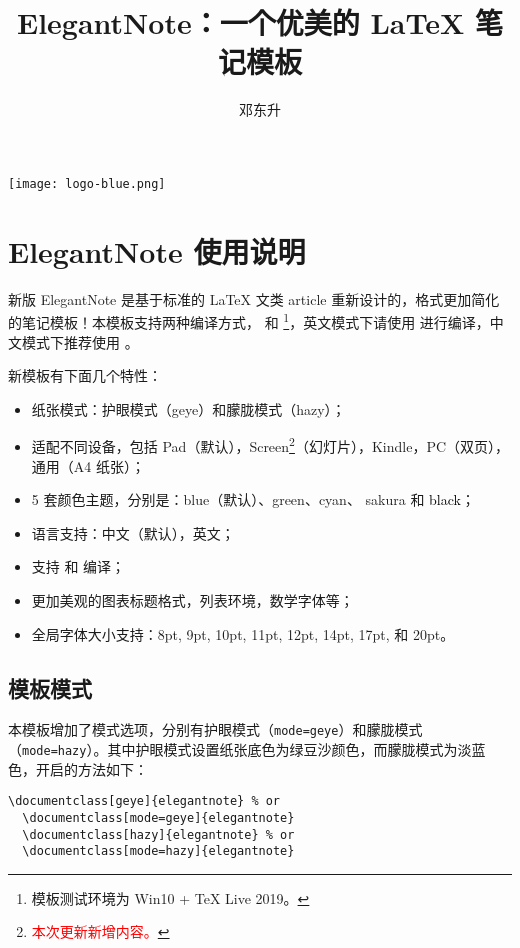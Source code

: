 \documentclass[cn,hazy,blue,screen,14pt]{elegantnote}
\title{ElegantNote：一个优美的 \LaTeX{} 笔记模板}
\author{邓东升}
\institute{Elegant\LaTeX{} Program}
\date{\zhtoday}
\begin{document}
\maketitle

\centerline{
  \texttt{[image: logo-blue.png]}
}


\section{ElegantNote 使用说明}

新版 ElegantNote 是基于标准的 \LaTeX{} 文类 article 重新设计的，格式更加简化的笔记模板！本模板支持两种编译方式， 和 \footnote{模板测试环境为 Win10 + \TeX{} Live 2019。}，英文模式下请使用  进行编译，中文模式下推荐使用 。

新模板有下面几个特性：
\begin{itemize}
  \item 纸张模式：护眼模式（geye）和朦胧模式（hazy）；
  \item 适配不同设备，包括 Pad（默认），Screen\footnote{\textcolor{red}{本次更新新增内容。}}（幻灯片），Kindle，PC（双页），通用（A4 纸张）；
  \item 5 套颜色主题，分别是：\textcolor{eblue}{blue}（默认）、\textcolor{egreen}{green}、\textcolor{ecyan}{cyan}、 \textcolor{sakura}{sakura} 和 \textcolor{black}{black}；
  \item 语言支持：中文（默认），英文；
  \item 支持  和  编译；
  \item 更加美观的图表标题格式，列表环境，数学字体等；
  \item 全局字体大小支持：8pt, 9pt, 10pt, 11pt, 12pt, 14pt, 17pt, 和 20pt。
\end{itemize}


\subsection{模板模式}

本模板增加了模式选项，分别有护眼模式（\lstinline{mode=geye}）和朦胧模式（\lstinline{mode=hazy}）。其中护眼模式设置纸张底色为绿豆沙颜色，而朦胧模式为淡蓝色，开启的方法如下：
\begin{lstlisting}[frame=none]  
  \documentclass[geye]{elegantnote} % or
  \documentclass[mode=geye]{elegantnote}
  \documentclass[hazy]{elegantnote} % or
  \documentclass[mode=hazy]{elegantnote}
\end{lstlisting}
\end{document}
